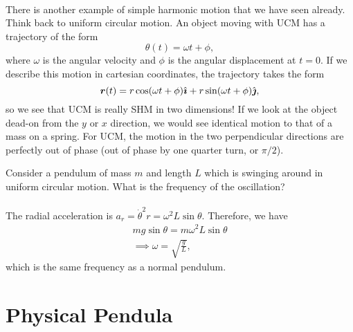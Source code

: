 \documentclass[../classical_mechanics.tex]{subfiles}
\begin{document}
        \paragraph{}
        There is another example of simple harmonic motion that we have seen already.
        Think back to uniform circular motion.
        An object moving with UCM has a trajectory of the form
        \begin{equation}
            \theta(t)=\omega t+\phi,
        \end{equation}
        where $\omega$ is the angular velocity and $\phi$ is the angular displacement at $t=0$.
        If we describe this motion in cartesian coordinates, the trajectory takes the form
        \begin{equation}
            \boldsymbol{r}(t)=r\cos(\omega t+\phi)\hat{\boldsymbol{\imath}}+r\sin(\omega t+\phi)\hat{\boldsymbol{\jmath}},
        \end{equation}
        so we see that UCM is really SHM in two dimensions!
        If we look at the object dead-on from the $y$ or $x$ direction, we would see identical motion to that of a mass on a spring.
        For UCM, the motion in the two perpendicular directions are perfectly out of phase (out of phase by one quarter turn, or $\pi/2$).
        \begin{example}
            Consider a pendulum of mass $m$ and length $L$ which is swinging around in uniform circular motion.
            What is the frequency of the oscillation?

            \paragraph{}
            The radial acceleration is $a_r=\dot{\theta}^2r=\omega^2L\sin\theta$.
            Therefore, we have
            \begin{gather}
                mg\sin\theta=m\omega^2L\sin\theta\\
                \implies\omega=\sqrt{\frac{g}{L}},
            \end{gather}
            which is the same frequency as a normal pendulum.
        \end{example}

    \section{Physical Pendula}\label{sec:physical-pendula}
\end{document}
